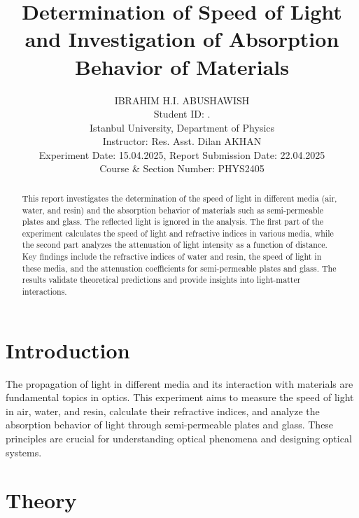 \documentclass[journal]{IEEEtran}
\begin{document}
\title{Determination of Speed of Light and Investigation of Absorption Behavior of Materials}
\author{IBRAHIM H.I. ABUSHAWISH \\

{\small Student ID: \hspace{1.5cm}. \\ 
Istanbul University, Department of Physics \\
Instructor: Res. Asst. Dilan AKHAN \\
Experiment Date: 15.04.2025, Report Submission Date: 22.04.2025\\
Course \& Section Number: PHYS2405}}


\maketitle

\begin{abstract}
    This report investigates the determination of the speed of light in different media (air, water, and resin) and the absorption behavior of materials such as semi-permeable plates and glass. The reflected light is ignored in the analysis. The first part of the experiment calculates the speed of light and refractive indices in various media, while the second part analyzes the attenuation of light intensity as a function of distance. Key findings include the refractive indices of water and resin, the speed of light in these media, and the attenuation coefficients for semi-permeable plates and glass. The results validate theoretical predictions and provide insights into light-matter interactions.
\end{abstract}

\section{Introduction}
The propagation of light in different media and its interaction with materials are fundamental topics in optics. This experiment aims to measure the speed of light in air, water, and resin, calculate their refractive indices, and analyze the absorption behavior of light through semi-permeable plates and glass. These principles are crucial for understanding optical phenomena and designing optical systems.

\section{Theory}
\end{document}
